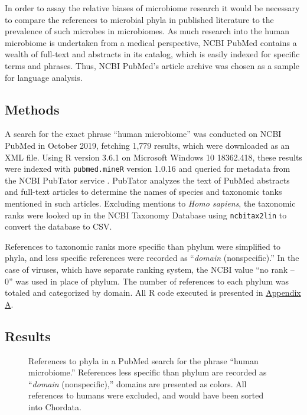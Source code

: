 \documentclass{../../../coursework}
\begin{document}
In order to assay the relative biases of microbiome research it would be
necessary to compare the references to microbial phyla in published
literature to the prevalence of such microbes in microbiomes. As much
research into the human microbiome is undertaken from a medical perspective,
NCBI PubMed contains a wealth of full-text and abstracts in its catalog,
which is easily indexed for specific terms and phrases. Thus, NCBI PubMed's
article archive was chosen as a sample for language analysis.

\subsection{Methods}

A search for the exact phrase ``human microbiome'' was conducted on NCBI
PubMed in October 2019, fetching 1,779 results, which were downloaded as an
XML file. Using R version 3.6.1 \parencite{RCo19} on Microsoft Windows 10
18362.418, these results were indexed with \texttt{pubmed.mineR} version
1.0.16 \parencite{Ran19} and queried for metadata from the NCBI PubTator
service \parencite{Wei19}. PubTator analyzes the text of PubMed abstracts and
full-text articles to determine the names of species and taxonomic tanks
mentioned in such articles. Excluding mentions to \textit{Homo sapiens}, the
taxonomic ranks were looked up in the NCBI Taxonomy Database
\parencite{Nat19} using \texttt{ncbitax2lin} \parencite{Xue19} to convert the
database to CSV.

References to taxonomic ranks more specific than phylum were simplified to
phyla, and less specific references were recorded as ``\textit{domain}
(nonspecific).'' In the case of viruses, which have separate ranking system,
the NCBI value ``no rank – 0'' was used in place of phylum. The number of
references to each phylum was totaled and categorized by domain. All R code
executed is presented in \hyperref[sec:appendix_a]{Appendix A}.

\subsection{Results}

\begin{figure}
    
    \caption{References to phyla in a PubMed search for the phrase
             ``human microbiome.'' References less specific than phylum are
             recorded as ``\textit{domain} (nonspecific),'' domains are
             presented as colors. All references to humans were excluded, and
             would have been sorted into Chordata.}
    \label{fig:1}
\end{figure}
\end{document}
